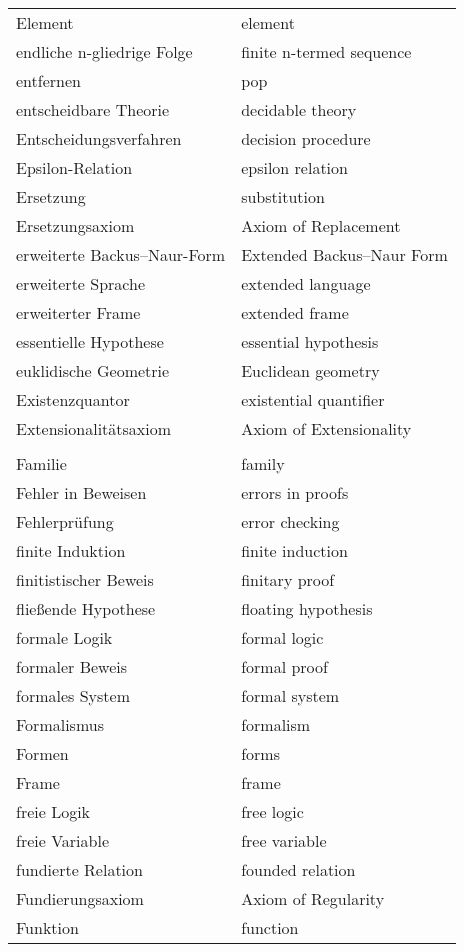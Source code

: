 \begin{longtabu}   { @{} X[l] X[l] }
    Element & element \\
    endliche n-gliedrige Folge & finite n-termed sequence \\
    entfernen & pop \\
    entscheidbare Theorie & decidable theory \\
    Entscheidungsverfahren & decision procedure \\
    Epsilon-Relation & epsilon relation \\
    Ersetzung & substitution \\
    Ersetzungsaxiom & Axiom of Replacement \\
    erweiterte Backus--Naur-Form & Extended Backus--Naur Form \\
    erweiterte Sprache & extended language \\
    erweiterter Frame & extended frame \\
    essentielle Hypothese & essential hypothesis \\
    euklidische Geometrie & Euclidean geometry \\
    Existenzquantor & existential quantifier \\
    Extensionalitätsaxiom & Axiom of Extensionality \\
     & \\
    Familie & family \\
    Fehler in Beweisen & errors in proofs \\
    Fehlerprüfung & error checking \\
    finite Induktion & finite induction \\
    finitistischer Beweis & finitary proof \\
    fließende Hypothese & floating hypothesis \\
    formale Logik & formal logic \\
    formaler Beweis & formal proof \\
    formales System & formal system \\
    Formalismus & formalism \\
    Formen & forms \\
    Frame & frame \\
    freie Logik & free logic \\
    freie Variable & free variable \\
    fundierte Relation & founded relation \\
    Fundierungsaxiom & Axiom of Regularity \\
    Funktion & function \\

\end{longtabu}
